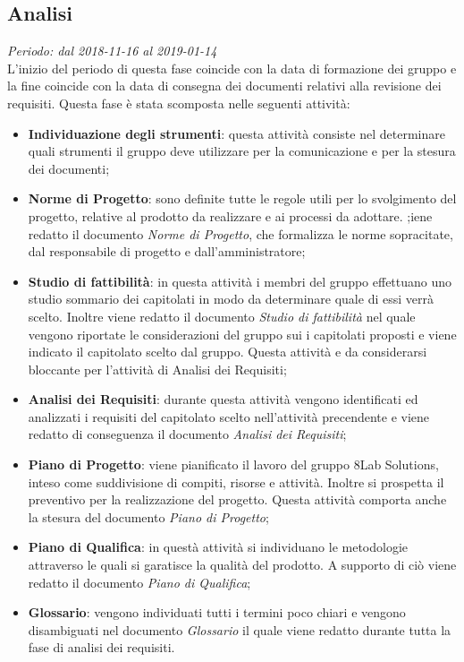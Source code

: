 \subsection{Analisi}
\textit{Periodo: dal 2018-11-16 al 2019-01-14}\\
L'inizio del periodo di questa fase coincide con la data di formazione dei 
gruppo e la fine coincide con la data di consegna dei documenti relativi alla 
revisione dei requisiti. Questa fase è stata scomposta nelle seguenti attività:
\begin{itemize}
	\item \textbf{Individuazione degli strumenti}: questa attività consiste nel 
	determinare quali strumenti il gruppo deve utilizzare per la comunicazione 
	e per la stesura dei documenti; 
	\item \textbf{Norme di Progetto}: sono definite tutte le regole utili per lo svolgimento del progetto, relative al prodotto da realizzare e ai processi da adottare. ;iene redatto il documento \textit{Norme 
	di Progetto}, che formalizza le norme sopracitate, dal responsabile di progetto e dall'amministratore;
	\item \textbf{Studio di fattibilità}: in questa attività i membri del gruppo effettuano uno studio sommario dei capitolati in modo da determinare quale di essi verrà scelto. Inoltre viene redatto il documento 
	\textit{Studio di fattibilità} nel quale vengono riportate le considerazioni del gruppo sui i capitolati proposti e viene indicato il capitolato scelto dal gruppo. 
	Questa attività e da considerarsi bloccante per l'attività di Analisi dei 
	Requisiti;
	\item \textbf{Analisi dei Requisiti}: durante questa attività vengono 
	identificati ed analizzati i requisiti del capitolato scelto nell'attività 
	precendente e viene redatto di conseguenza il documento \textit{Analisi dei 
	Requisiti};
	\item \textbf{Piano di Progetto}: viene pianificato il 
	lavoro del gruppo 8Lab Solutions, inteso come suddivisione di compiti, 
	risorse e attività. Inoltre si prospetta il preventivo per la realizzazione 
	del progetto. Questa attività comporta anche la stesura 
	del documento \textit{Piano di Progetto};
	\item \textbf{Piano di Qualifica}: in questà attività si individuano le 
	metodologie attraverso le quali si garatisce la qualità del prodotto. A supporto di ciò viene redatto il documento \textit{Piano di Qualifica}; 
	\item \textbf{Glossario}: vengono individuati tutti i termini poco chiari e 
	vengono disambiguati nel documento \textit{Glossario} il quale viene 
	redatto durante tutta la fase di analisi dei requisiti.
\end{itemize}
